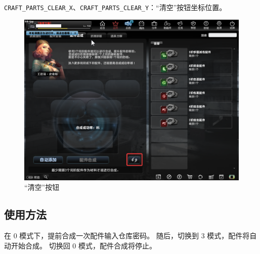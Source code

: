 \lstinline{CRAFT_PARTS_CLEAR_X}、\lstinline{CRAFT_PARTS_CLEAR_Y}：“清空”按钮坐标位置。

\begin{figure}[H]
    \Centering
    \includegraphics[width=\textwidth]{docs/assets/clear.png}
    \caption{“清空”按钮}
\end{figure}

\subsection{使用方法}

在 0 模式下，提前合成一次配件输入仓库密码。
随后，切换到 3 模式，配件将自动开始合成。
切换回 0 模式，配件合成将停止。